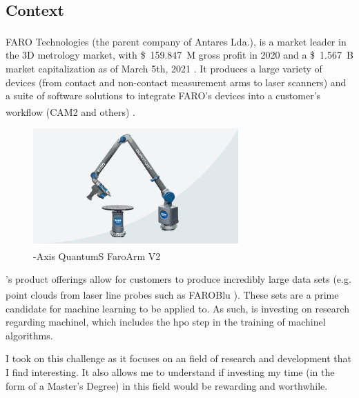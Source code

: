 
\subsection{Context}

FARO Technologies\textsuperscript{\textregistered} (the parent company of Antares Lda.), is a market leader in the 3D metrology market, with \SI{159.847}[\$]{M} gross profit in 2020 \parencite{faro_2021_financial_results} and a \SI{1.567}[\$]{B} market capitalization as of March 5th, 2021 \parencite{faro_stock_info}. It produces a large variety of devices (from contact and non-contact measurement arms to laser scanners) and a suite of software solutions to integrate FARO's devices into a customer's workflow (CAM2\textsuperscript{\textregistered} and others) \parencite{faro_homepage}.

\begin{figure}[h]
\centering
\includegraphics[width=0.7\textwidth]{images/faro_quantum_s_arm.png}
\caption{-Axis QuantumS FaroArm\textsuperscript{\textregistered} V2}
\end{figure}
 
\faro's product offerings allow for customers to produce incredibly large data sets (e.g. point clouds from laser line probes such as FAROBlu\textsuperscript{\textregistered} \parencite{faro_quantums}). These sets are a prime candidate for machine learning to be applied to. As such, \faro is investing on research regarding \acrlong{machinel}, which includes the \acrfull{hpo} step in the training of \acrshort{machinel} algorithms.

I took on this challenge as it focuses on an field of research and development that I find interesting. It also allows me to understand if investing my time (in the form of a Master's Degree) in this field would be rewarding and worthwhile.
